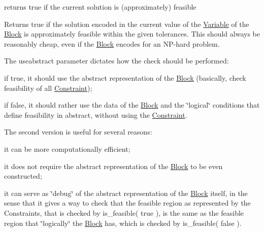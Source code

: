 returns true if the current solution is (approximately) feasible 

Returns true if the solution encoded in the current value of the \mbox{\hyperlink{class_s_m_spp__di__unipi__it_1_1_variable}{Variable}} of the \mbox{\hyperlink{class_s_m_spp__di__unipi__it_1_1_block}{Block}} is approximately feasible within the given tolerances. This should always be reasonably cheap, even if the \mbox{\hyperlink{class_s_m_spp__di__unipi__it_1_1_block}{Block}} encodes for an N\+P-\/hard problem.

The useabstract parameter dictates how the check should be performed\+:


\begin{DoxyItemize}
\item if true, it should use the abstract representation of the \mbox{\hyperlink{class_s_m_spp__di__unipi__it_1_1_block}{Block}} (basically, check feasibility of all \mbox{\hyperlink{class_s_m_spp__di__unipi__it_1_1_constraint}{Constraint}});
\item if false, it should rather use the data of the \mbox{\hyperlink{class_s_m_spp__di__unipi__it_1_1_block}{Block}} and the \char`\"{}logical\char`\"{} conditions that define feasibility in abstract, without using the \mbox{\hyperlink{class_s_m_spp__di__unipi__it_1_1_constraint}{Constraint}}.
\end{DoxyItemize}

The second version is useful for several reasons\+:


\begin{DoxyItemize}
\item it can be more computationally efficient;
\item it does not require the abstract representation of the \mbox{\hyperlink{class_s_m_spp__di__unipi__it_1_1_block}{Block}} to be even constructed;
\item it can serve as \char`\"{}debug\char`\"{} of the abstract representation of the \mbox{\hyperlink{class_s_m_spp__di__unipi__it_1_1_block}{Block}} itself, in the sense that it gives a way to check that the feasible region as represented by the Constraints, that is checked by is\+\_\+feasible( true ), is the same as the feasible region that \char`\"{}logically\char`\"{} the \mbox{\hyperlink{class_s_m_spp__di__unipi__it_1_1_block}{Block}} has, which is checked by is\+\_\+feasible( false ).
\end{DoxyItemize}


